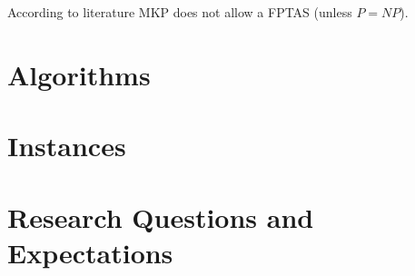 \documentclass{article}
\begin{document}
According to literature MKP does not allow a FPTAS (unless $P=NP$).


\section{Algorithms}
%

\section{Instances}

\section{Research Questions and Expectations}
%
\end{document}
